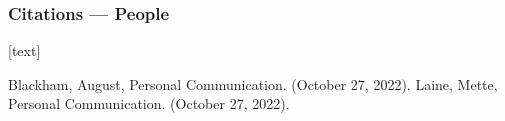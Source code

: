 \documentclass{beamer}
\begin{document}
\begin{frame}
	\frametitle{Citations --- People}
	[text]
	\begin{thebibliography}{2}
		 Blackham, August, Personal Communication. (October 27, 2022).
		 Laine, Mette, Personal Communication. (October 27, 2022).
	\end{thebibliography}
\end{frame}
\end{document}
